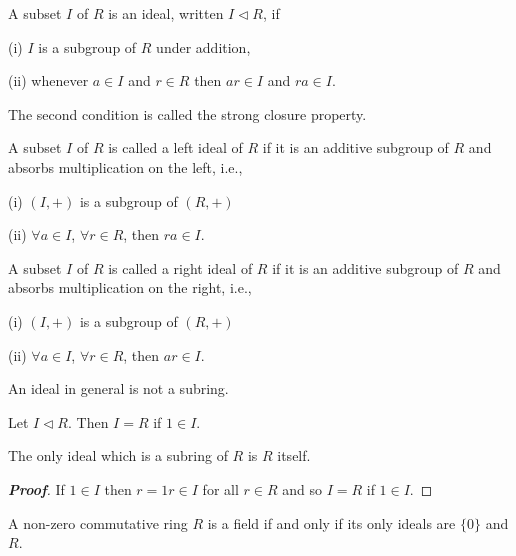 \begin{definition}\label{def:ideal_ring}
A subset $I$ of $R$ is an ideal, written $I \lhd R$, if
\ben
\item [(i)] $I$ is a subgroup of $R$ under addition,
\item [(ii)] whenever $a \in I$ and $r \in R$ then $ar \in I$ and $ra\in I$.
\een

The second condition is called the strong closure property.

A subset $I$ of $R$ is called a left ideal of $R$ if it is an additive subgroup of $R$ and absorbs multiplication on the left, i.e.,
\ben
\item [(i)] $(I,+)$ is a subgroup of $(R,+)$
\item [(ii)] $\forall a \in I$, $\forall r \in R$, then $ra \in I$.
\een%

A subset $I$ of $R$ is called a right ideal of $R$ if it is an additive subgroup of $R$ and absorbs multiplication on the right, i.e.,
\ben
\item [(i)] $(I,+)$ is a subgroup of $(R,+)$
\item [(ii)] $\forall a \in I$, $\forall r \in R$, then $ar \in I$.
\een%
\end{definition}

\begin{remark}
An ideal in general is not a subring.
\end{remark}

\begin{lemma}\label{lem:1_belongs_to_ideal_implies_ideal_equals_ring}
Let $I \lhd R$. Then $I = R$ if $1 \in I$.
\end{lemma}

\begin{remark}
The only ideal which is a subring of $R$ is $R$ itself.
\end{remark}

\begin{proof}[\bf Proof]
If $1 \in I$ then $r = 1 r \in I$ for all $r \in R$ and so $I = R$ if $1 \in I$.
\end{proof}


\begin{lemma}\label{lem:ring_field_only_ideal}
A non-zero commutative ring $R$ is a field if and only if its only ideals are $\{0\}$ and $R$.
\end{lemma}

